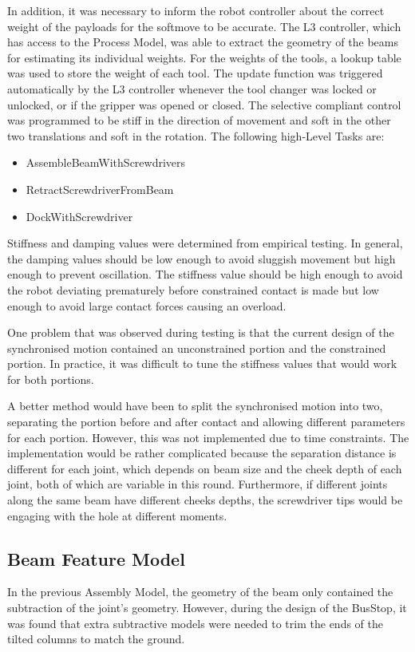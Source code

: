 In addition, it was necessary to inform the robot controller about the correct weight of the payloads for the softmove to be accurate. The L3 controller, which has access to the Process Model, was able to extract the geometry of the beams for estimating its individual weights. For the weights of the tools, a lookup table was used to store the weight of each tool. The update function was triggered automatically by the L3 controller whenever the tool changer was locked or unlocked, or if the gripper was opened or closed. 
The selective compliant control was programmed to be stiff in the direction of movement and soft in the other two translations and soft in the rotation. The following high-Level Tasks are: 
\begin{itemize}
    \item AssembleBeamWithScrewdrivers
    \item RetractScrewdriverFromBeam
    \item DockWithScrewdriver
\end{itemize}

Stiffness and damping values were determined from empirical testing. In general, the damping values should be low enough to avoid sluggish movement but high enough to prevent oscillation. The stiffness value should be high enough to avoid the robot deviating prematurely before constrained contact is made but low enough to avoid large contact forces causing an overload. 

One problem that was observed during testing is that the current design of the synchronised motion contained an unconstrained portion and the constrained portion. In practice, it was difficult to tune the stiffness values that would work for both portions. 

A better method would have been to split the synchronised motion into two, separating the portion before and after contact and allowing different parameters for each portion. However, this was not implemented due to time constraints. The implementation would be rather complicated because the separation distance is different for each joint, which depends on beam size and the cheek depth of each joint, both of which are variable in this round. Furthermore, if different joints along the same beam have different cheeks depths, the screwdriver tips would be engaging with the hole at different moments. 

\subsection{Beam Feature Model}
In the previous Assembly Model, the geometry of the beam only contained the subtraction of the joint's geometry. However, during the design of the BusStop, it was found that extra subtractive models were needed to trim the ends of the tilted columns to match the ground.

